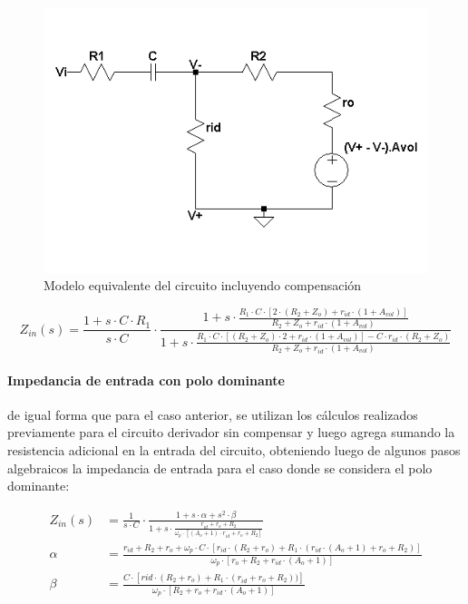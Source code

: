 \begin{figure}[H]
	\centering
	\includegraphics[scale=0.75]{Recursos/Derivador_compensado/Compensado_modelo_impedancia.png}
	\caption{Modelo equivalente del circuito incluyendo compensaci\'on}
	\label{fig:derivador_compensado_modelo}
\end{figure}

\begin{equation}
	Z_{in}(s) = \frac{1 + s \cdot C  \cdot R_1}{s \cdot C} \cdot \frac{1 + s \cdot \frac{R_1 \cdot C \cdot \left[ 2 \cdot (R_2 + Z_o) + r_{id} \cdot(1 + A_{vol}) \right]}{R_2 + Z_o + r_{id} \cdot (1 + A_{vol})}}{1 + s \cdot \frac{R_1 \cdot C \cdot \left[ (R_2 + Z_o) \cdot 2 + r_{id} \cdot ( 1 + A_{vol}) \right] - C \cdot r_{id} \cdot ( R_2 + Z_o)}{R_2 + Z_o + r_{id} \cdot(1+A_{vol})}}
\end{equation}


\paragraph*{Impedancia de entrada con polo dominante} de igual forma que para el caso anterior, se utilizan los c\'alculos realizados previamente para el circuito derivador sin compensar y luego agrega sumando la resistencia adicional en la entrada del circuito, obteniendo luego de algunos pasos algebraicos la impedancia de entrada para el caso donde se considera el polo dominante:

\begin{align*}
	Z_{in}(s) & = \frac{1}{s \cdot C} \cdot \frac{1 + s \cdot \alpha + s^{2} \cdot \beta}{1 + s \cdot \frac{r_{id} + r_{o} + R_2}{\omega_p \cdot \left[ (A_o + 1 ) \cdot r_{id} + r_o + R_2 \right]}} \\
	\alpha & = \frac{r_{id} + R_2 + r_o + \omega_p \cdot C \cdot \left[ r_{id} \cdot ( R_2 + r_o) + R_1 \cdot(r_{id} \cdot ( A_o + 1) + r_o + R_2) \right] }{\omega_p \cdot \left[ r_o + R_2 + r_{id} \cdot (A_o + 1) \right]} \\
	\beta & = \frac{C \cdot \left[ r{id} \cdot ( R_2 + r_o ) + R_1 \cdot (r_{id} + r_o + R_2)) \right]}{\omega_p \cdot \left[ R_2 + r_o + r_{id} \cdot (A_o + 1) \right] }
\end{align*}


